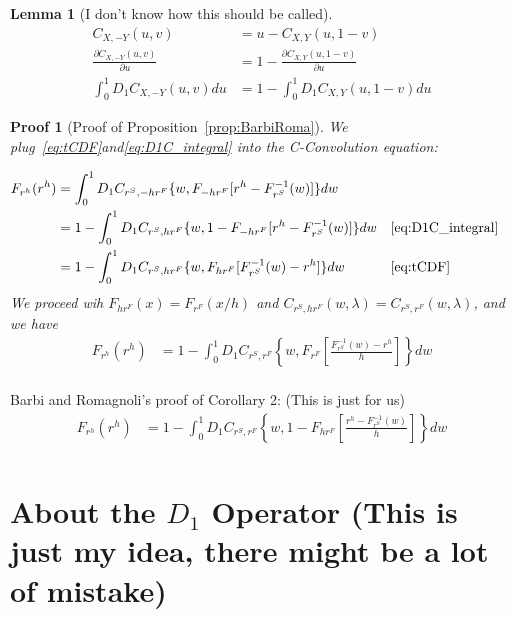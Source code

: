 \documentclass[11pt, leqno]{article}
\newtheorem{lemma}{Lemma}[section]
\newtheorem{prf}{Proof}[section]
\numberwithin{equation}{section}
\begin{document}
\begin{lemma}[I don't know how this should be called]
    \begin{align}
        C_{X,-Y}(u,v) &= u - C_{X,Y}(u, 1-v)\nonumber\\
        \frac{\partial C_{X,-Y}(u,v)}{\partial u} &= 1 - \frac{\partial C_{X,Y}(u, 1-v)}{\partial u}\\
        \int^1_0 D_1 C_{X,-Y}(u,v)du &= 1 - \int^1_0 D_1 C_{X,Y}(u,1-v)du \label{eq:D1C_integral}
    \end{align}
\end{lemma}
\begin{prf}[Proof of Proposition~\ref{prop:BarbiRoma}]

    We plug~\eqref{eq:tCDF}and\eqref{eq:D1C_integral} into the C-Convolution equation:

    \begin{align*}
        F_{r^h}(r^h) &= \int^1_0 D_1 C_{r^S, -hr^F}
        \{w,
        F_{-hr^F}[r^h - F^{-1}_{r^S}(w)
        ]\}dw \\
        &= 1 - \int^1_0 D_1 C_{r^S, hr^F}
        \{w,
        1- F_{-hr^F}[r^h - F^{-1}_{r^S}(w)
        ]\}dw && \text{\eqref{eq:D1C_integral}}\\
        &= 1 - \int^1_0 D_1 C_{r^S, hr^F}
        \{w,
        F_{hr^F}[F^{-1}_{r^S}(w) - r^h
        ]\}dw && \text{\eqref{eq:tCDF}}
    \end{align*}
We proceed wih $F_{hr^F}(x)=F_{r^F}(x/h)$ and $C_{r^S,hr^F}(w, \lambda)=C_{r^S,r^F}(w, \lambda)$, and we have
    \begin{align*}
        F_{r^h}(r^h)
        &= 1- \int^1_0 D_1 C_{r^S, r^F}
        \left\{
        w,
        F_{r^F}
        \left[
        \frac{F^{-1}_{r^S}(w)-r^h}{h}
        \right]
        \right\}dw \\
    \end{align*}
\end{prf}

Barbi and Romagnoli's proof of Corollary 2: (This is just for us)
    \begin{align*}
        F_{r^h}(r^h)
        &= 1 - \int^1_0 D_1 C_{r^S, r^F}
        \left\{w,
        1- F_{hr^F}\left[\frac{r^h - F^{-1}_{r^S}(w)}{h}
        \right]\right\}dw \\
    \end{align*}

    \section{About the $D_1$ Operator (This is just my idea, there might be a lot of mistake)}\label{sec:D1}
\end{document}
